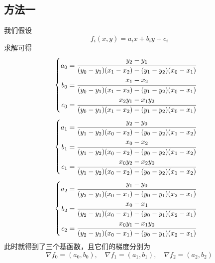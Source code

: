 \documentclass[12pt,a4paper]{article}
\begin{document}
\subsection{方法一}
我们假设\begin{equation}
f_i(x,y)=a_ix+b_iy+c_i
\end{equation}
求解可得$$\begin{cases}\begin{aligned}a_0&=\cfrac{y_2-y_1}{(y_0-y_1)(x_1-x_2)-(y_1-y_2)(x_0-x_1)}\\ b_0&=\cfrac{x_1-x_2}{(y_0-y_1)(x_1-x_2)-(y_1-y_2)(x_0-x_1)}\\
c_0&=\cfrac{x_2y_1-x_1y_2}{(y_0-y_1)(x_1-x_2)-(y_1-y_2)(x_0-x_1)}
\end{aligned}\end{cases}$$
$$\begin{cases}\begin{aligned}a_1&=\cfrac{y_2-y_0}{(y_1-y_2)(x_0-x_2)-(y_0-y_2)(x_1-x_2)}\\ b_1&=\cfrac{x_0-x_2}{(y_1-y_2)(x_0-x_2)-(y_0-y_2)(x_1-x_2)}\\
c_1&=\cfrac{x_0y_2-x_2y_0}{(y_1-y_2)(x_0-x_2)-(y_0-y_2)(x_1-x_2)}
\end{aligned}\end{cases}$$
$$\begin{cases}\begin{aligned}a_2&=\cfrac{y_1-y_0}{(y_2-y_1)(x_0-x_1)-(y_0-y_1)(x_2-x_1)}\\ b_2&=\cfrac{x_0-x_1}{(y_2-y_1)(x_0-x_1)-(y_0-y_1)(x_2-x_1)}\\
c_2&=\cfrac{x_0y_1-x_1y_0}{(y_2-y_1)(x_0-x_1)-(y_0-y_1)(x_2-x_1)}
\end{aligned}\end{cases}$$
此时就得到了三个基函数，且它们的梯度分别为$$\nabla f_0=(a_0,b_0),\quad \nabla f_1=(a_1,b_1),\quad \nabla f_2=(a_2,b_2)$$
\end{document}
